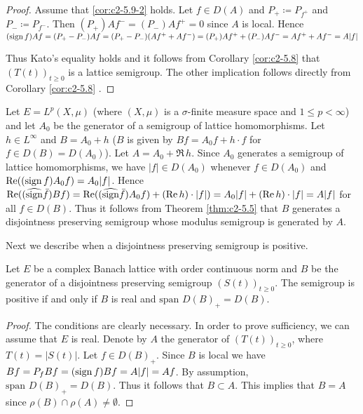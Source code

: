 \begin{proof}
Assume that \ref{cor:c2-5.9-2}   holds. 
Let $f \in D(A)$ and $P_{+} \coloneqq P_{f^{+}}$ and $P_{-} \coloneqq P_{f^{-}}$.
Then $(P_{+})Af^{-} = (P_{-})Af^{+} = 0$ since $A$ is local. 
Hence $(\operatorname{sign}  f)Af = (P_{+} - P_{-})Af = (P_{+} - P_{-})(Af^{+} + Af^{-}) = 
(P_{+})Af^{+} + (P_{-})Af^{-} = Af^{+} + Af^{-} = A|f|$

Thus Kato's equality holds and it follows from Corollary \ref{cor:c2-5.8}   that $(T(t))_{t \geq 0}$ is a lattice semigroup. The other implication follows directly from Corollary  \ref{cor:c2-5.8}  .
\end{proof}
\begin{example}\label{ex:c2-5.10}
%
%
%
Let $E = L^{p}(X,\mu)$ (where $(X,\mu)$ is a $\sigma$-finite measure space and $1 \leq p < \infty$) and let $A_{0}$ be the generator of a semigroup of lattice homomorphisms. 
Let $h \in L^{\infty}$ and $B = A_{0} + h$ (\ie $B$ is given by $Bf = A_{0}f + h \cdot f$ for $f \in D(B) = D(A_{0})$). 
Let $A = A_{0} + \Re \, h$.
Since $A_{0}$ generates a semigroup of lattice homomorphisms, we have $|f| \in D(A_{0})$ whenever $f \in D(A_{0})$ and $\mathop{}\!\mathrm{Re}((\operatorname{sign}  f)A_{0}f) = A_{0}|f|$.
Hence $\mathop{}\!\mathrm{Re}((\widehat{\operatorname{sign}}  \bar{f})Bf) = \mathop{}\!\mathrm{Re}((\widehat{\operatorname{sign}}  \bar{f})A_{0}f) + (\mathop{}\!\mathrm{Re} \, h) \cdot |f|) = A_{0}|f| + (\mathop{}\!\mathrm{Re} \, h) \cdot |f| = A|f|$ for all $f \in D(B)$. 
Thus it follows from Theorem \ref{thm:c2-5.5}   that $B$ generates a disjointness preserving semigroup whose modulus semigroup is generated by $A$.
\end{example}

Next we describe when a disjointness preserving semigroup is positive.

\begin{proposition}\label{prop:c2-5.11}
%
%
Let $E$ be a complex Banach lattice with order continuous norm and $B$ be the generator of a disjointness preserving semigroup $(S(t))_{t \geq 0}$. 
The semigroup is positive if and only if $B$ is real and $\text{span } D(B)_{+} = D(B)$.
\end{proposition}

\begin{proof}
The conditions are clearly necessary. 
In order to prove sufficiency, we can assume that $E$ is real. 
Denote by $A$ the generator of $(T(t))_{t \geq 0}$, where $T(t) = |S(t)|$. 
Let $f \in D(B)_{+}$. 
Since $B$ is local we have $Bf = P_{f}Bf = (\operatorname{sign}  f)Bf = A|f| = Af$. 
By assumption, $\text{span } D(B)_{+} = D(B)$. 
Thus it follows that $B \subset A$. 
This implies that $B = A$ since $\rho(B) \cap \rho(A) \neq \emptyset$.
\end{proof}

